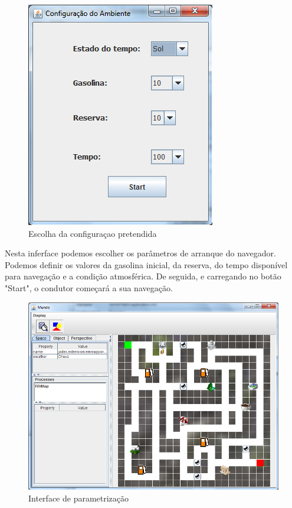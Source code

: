 \documentclass[15pt,a4paper]{article}
\begin{document}
\begin{figure}[htp]
  \centering
  \includegraphics[scale=0.5] {launch_config.png}
  \caption{Escolha da configuraçao pretendida}
\end{figure}

Nesta inferface podemos escolher os parâmetros de arranque do navegador. Podemos definir os valores da gasolina inicial, da reserva, do tempo disponível para navegação e a condição atmosférica.
De seguida, e carregando no botão "Start", o condutor começará a sua navegação.

\begin{figure}[htp]
  \centering
  \includegraphics[scale=0.7] {mapa_mundo.png}
  \caption{Interface de parametrização}
\end{figure}
\end{document}
